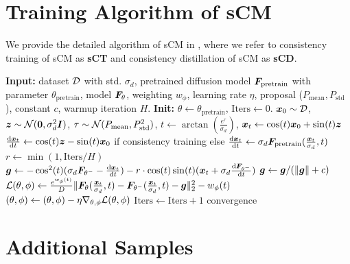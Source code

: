 \section{Training Algorithm of sCM}
\label{appendix:algorithm}

We provide the detailed algorithm of sCM in , where we refer to consistency training of sCM as \textbf{sCT} and consistency distillation of sCM as \textbf{sCD}.

\begin{algorithm}[ht]
\caption{Simplified and Stabilized Continuous-time Consistency Models (sCM).}\label{alg:sCM}
\centering
\begin{algorithmic}
\State \textbf{Input:} dataset ${\mathcal{D}}$ with std. $\sigma_d$, pretrained diffusion model ${\bm{F}}_{\text{pretrain}}$ with parameter $\theta_{\text{pretrain}}$, model ${\bm{F}}_\theta$, weighting $w_\phi$, learning rate $\eta$, proposal ($P_{\text{mean}}, P_{\text{std}}$), constant $c$, warmup iteration $H$.
\State \textbf{Init:} $\theta \gets \theta_{\text{pretrain}}$, $\text{Iters}\gets 0$.
\Repeat
    \State ${\bm{x}}_0\sim {\mathcal{D}}$, ${\bm{z}}\sim {\mathcal{N}}({\bm{0}},\sigma_d^2{\bm{I}})$, $\tau \sim {\mathcal{N}}(P_{\text{mean}}, P^2_{\text{std}})$, $t \gets \arctan(\frac{e^\tau}{\sigma_d})$, ${\bm{x}}_t \gets \cos(t){\bm{x}}_0 + \sin(t){\bm{z}}$
    \State $\frac{\mathrm{d} {\bm{x}}_t}{\mathrm{d} t} \gets \cos(t){\bm{z}} - \sin(t){\bm{x}}_0$ if consistency training else $\frac{\mathrm{d} {\bm{x}}_t}{\mathrm{d} t} \gets \sigma_d{\bm{F}}_{\text{pretrain}}(\frac{{\bm{x}}_t}{\sigma_d},t)$
    \State $r \gets \min(1, \text{Iters} / H)$ 
    \State ${\bm{g}} \gets -\cos^2(t)(\sigma_d{\bm{F}}_{\theta^-} - \frac{\mathrm{d}{\bm{x}}_t}{\mathrm{d} t}) - r\cdot \cos(t)\sin(t) ({\bm{x}}_t + \sigma_d \frac{\mathrm{d} {\bm{F}}_{\theta^-}}{\mathrm{d} t})$  
    \State ${\bm{g}} \gets {\bm{g}} / (\|{\bm{g}}\| + c)$ 
    \State ${\mathcal{L}}(\theta,\phi) \gets \frac{e^{w_\phi(t)}}{D}\|
        {\bm{F}}_\theta(\frac{{\bm{x}}_t}{\sigma_d},t) - {\bm{F}}_{\theta^-}(\frac{{\bm{x}}_t}{\sigma_d},t)
        - {\bm{g}}
    \|_2^2 - w_\phi(t)$ 
    \State $(\theta, \phi) \gets (\theta, \phi) - \eta \nabla_{\theta,\phi}{\mathcal{L}}(\theta,\phi)$
    \State $\text{Iters}\gets \text{Iters} + 1$
\Until convergence
\end{algorithmic}
\end{algorithm}










\section{Additional Samples}
\label{appendix:samples}

